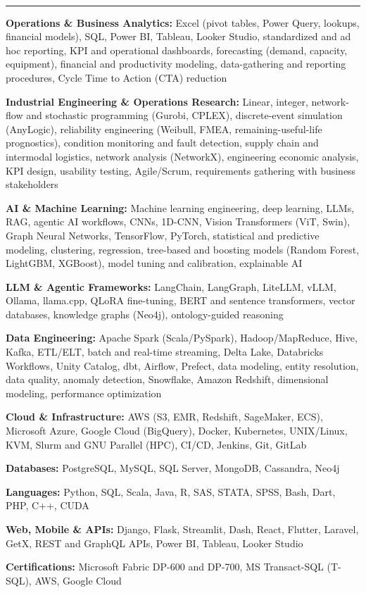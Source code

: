\documentclass[10pt,a4paper]{extarticle}
\newif\ifteaching
\newcommand{\sect}[2][]{\needspace{45pt}\vspace{9pt}%
  {\color{navy}\bfseries\large\textls[60]{\MakeUppercase{#2}}}{\color{muted}\small\ #1}\\[-6.5pt]
  {\color{navy}\rule{\linewidth}{0.5pt}}\par\vspace{-1pt}}
\newcommand{\skill}[2]{\noindent\textbf{#1:} #2\par\vspace{2pt}}
\begin{document}
\sect{Technical Skills}
\ifteaching\else{}
\fi
\skill{Operations \& Business Analytics}{Excel (pivot tables, Power Query, lookups, financial models), SQL, Power BI, Tableau, Looker Studio, standardized and ad hoc reporting, KPI and operational dashboards, forecasting (demand, capacity, equipment), financial and productivity modeling, data-gathering and reporting procedures, Cycle Time to Action (CTA) reduction}
\skill{Industrial Engineering \& Operations Research}{Linear, integer, network-flow and stochastic programming (Gurobi, CPLEX), discrete-event simulation (AnyLogic), reliability engineering (Weibull, FMEA, remaining-useful-life prognostics), condition monitoring and fault detection, supply chain and intermodal logistics, network analysis (NetworkX), engineering economic analysis, KPI design, usability testing, Agile/Scrum, requirements gathering with business stakeholders}
\skill{AI \& Machine Learning}{Machine learning engineering, deep learning, LLMs, RAG, agentic AI workflows, CNNs, 1D-CNN, Vision Transformers (ViT, Swin), Graph Neural Networks, TensorFlow, PyTorch, statistical and predictive modeling, clustering, regression, tree-based and boosting models (Random Forest, LightGBM, XGBoost), model tuning and calibration, explainable AI}
\skill{LLM \& Agentic Frameworks}{LangChain, LangGraph, LiteLLM, vLLM, Ollama, llama.cpp, QLoRA fine-tuning, BERT and sentence transformers, vector databases, knowledge graphs (Neo4j), ontology-guided reasoning}
\skill{Data Engineering}{Apache Spark (Scala/PySpark), Hadoop/MapReduce, Hive, Kafka, ETL/ELT, batch and real-time streaming, Delta Lake, Databricks Workflows, Unity Catalog, dbt, Airflow, Prefect, data modeling, entity resolution, data quality, anomaly detection, Snowflake, Amazon Redshift, dimensional modeling, performance optimization}
\skill{Cloud \& Infrastructure}{AWS (S3, EMR, Redshift, SageMaker, ECS), Microsoft Azure, Google Cloud (BigQuery), Docker, Kubernetes, UNIX/Linux, KVM, Slurm and GNU Parallel (HPC), CI/CD, Jenkins, Git, GitLab}
\skill{Databases}{PostgreSQL, MySQL, SQL Server, MongoDB, Cassandra, Neo4j}
\skill{Languages}{Python, SQL, Scala, Java, R, SAS, STATA, SPSS, Bash, Dart, PHP, C++, CUDA}
\skill{Web, Mobile \& APIs}{Django, Flask, Streamlit, Dash, React, Flutter, Laravel, GetX, REST and GraphQL APIs, Power BI, Tableau, Looker Studio}
\ifteaching\skill{Geospatial \& Networks}{NetworkX, WMS, GeoServer, OverPass API, Turf.js}\fi
\skill{Certifications}{Microsoft Fabric DP-600 and DP-700, MS Transact-SQL (T-SQL), AWS, Google Cloud}
\end{document}
